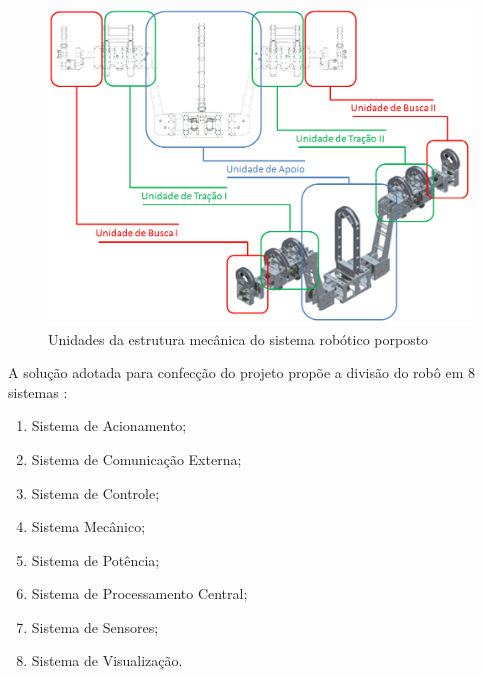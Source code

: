 \documentclass[12pt,oneside,a4paper, chapter=TITLE, section = TITLE, english, brazil]{abntex2}
\begin{document}
\begin{figure}[h] %
\centering
\includegraphics[scale=0.45]{./imagens/unidades_Robo}
\caption[Unidades da estrutura mecânica do sistema robótico porposto]{Unidades da estrutura mecânica do sistema robótico porposto \cite{cemig}}
\label{fig:unid_est_mec}
\end{figure}

A solução adotada para confecção do projeto propõe a divisão do robô em 8 sistemas \cite{cemig}:

\begin{enumerate}
\item Sistema de Acionamento;

\item Sistema de Comunicação Externa;

\item Sistema de Controle;

\item Sistema Mecânico;

\item Sistema de Potência;

\item Sistema de Processamento Central;

\item Sistema de Sensores;

\item Sistema de Visualização.

\end{enumerate}
\end{document}
